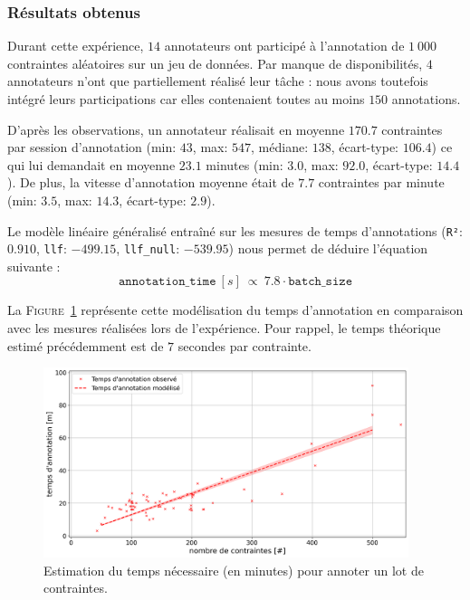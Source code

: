 		\subsubsection{Résultats obtenus}
		
			Durant cette expérience, $14$ annotateurs ont participé à l'annotation de $1~000$ contraintes aléatoires sur un jeu de données.
			Par manque de disponibilités, $4$ annotateurs n'ont que partiellement réalisé leur tâche : nous avons toutefois intégré leurs participations car elles contenaient toutes au moins $150$ annotations.
			
			D'après les observations, un annotateur réalisait en moyenne $170.7$ contraintes par session d'annotation (min: $43$, max: $547$, médiane: $138$, écart-type: $106.4$) ce qui lui demandait en moyenne $23.1$ minutes (min: $3.0$, max: $92.0$, écart-type: $14.4$).
			De plus, la vitesse d'annotation moyenne était de $7.7$ contraintes par minute (min: $3.5$, max: $14.3$, écart-type: $2.9$).
			
			Le modèle linéaire généralisé entraîné sur les mesures de temps d'annotations (\texttt{R²}: $0.910$, \texttt{llf}: $-499.15$, \texttt{llf\_null}: $-539.95$) nous permet de déduire l'équation suivante :
			\begin{equation}
				\label{equation:4.3.1-ETUDE-COUT-COUTS-TEMPS-ANNOTATION}
				\texttt{annotation\_time}~[s]~
				\propto~7.8 \cdot \texttt{batch\_size}
			\end{equation}
		
			La \textsc{Figure~\ref{figure:4.3.1-ETUDE-COUTS-TEMPS-ANNOTATION-SIMULATION}} représente cette modélisation du temps d'annotation en comparaison avec les mesures réalisées lors de l'expérience.
			Pour rappel, le temps théorique estimé précédemment est de $7$ secondes par contrainte.
			\begin{figure}[!htb]
				\centering
				\includegraphics[width=0.95\textwidth]{figures/etude-temps-annotation-1-modelisation-temps}
				\caption{
					Estimation du temps nécessaire (en minutes) pour annoter un lot de contraintes.
				}
				\label{figure:4.3.1-ETUDE-COUTS-TEMPS-ANNOTATION-SIMULATION}
			\end{figure}
		
